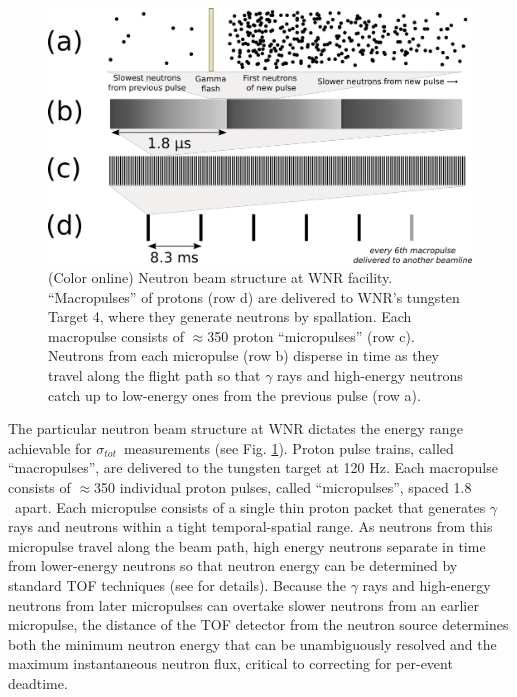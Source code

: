 \documentclass[twocolumn,secnumarabic,amssymb, nobibnotes, aps, prl,
superscriptaddress, nobalancelastpage, draft]{revtex4}
\newcommand{\tot}{\ensuremath{\sigma_{tot}}}
\begin{document}
\begin{figure}
    \includegraphics[width=\linewidth]{figures/beamStructure.png}
    \caption{(Color online) Neutron beam structure at WNR facility.
        ``Macropulses'' of protons (row d) are delivered to
        WNR's tungsten Target 4, where they generate neutrons by spallation.
        Each macropulse consists of
        $\approx$350 proton ``micropulses'' (row c). Neutrons
        from each micropulse (row b) disperse in
        time as they travel along the flight path so that $\gamma$ rays and high-energy 
    neutrons catch up to low-energy ones from the previous pulse (row a).}
    \label{BeamStructure}
\end{figure}

The particular neutron beam structure at WNR dictates the energy range
achievable for \tot\ measurements (see Fig. \ref{BeamStructure}).
Proton pulse trains, called ``macropulses'', are delivered to the tungsten target at 120 Hz.
Each macropulse consists of $\approx$350 individual proton pulses, called
``micropulses'', spaced 1.8 
\micro\second\ apart. Each micropulse consists of a single thin proton packet
that generates $\gamma$ rays and neutrons within a tight
temporal-spatial range. As neutrons from this micropulse travel along the beam path, 
high energy neutrons separate in time from lower-energy neutrons so that neutron
energy can be determined by standard TOF techniques (see \cite{Moore1980} for details).
Because the $\gamma$ rays and high-energy neutrons from later micropulses can
overtake slower neutrons from an earlier micropulse, the distance of the TOF
detector from the neutron source determines both the minimum neutron energy that can be 
unambiguously resolved and the maximum instantaneous neutron flux, critical to correcting
for per-event deadtime.
\end{document}
